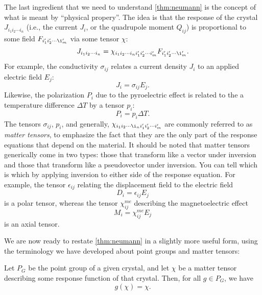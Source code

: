 The last ingredient that we need to understand \cref{thm:neumann} is the concept of what is meant by ``physical propery''.
The idea is that the response of the crystal $J_{i_1i_2\cdots i_n}$ (i.e., the current $J_i$, or the quadrupole moment $Q_{ij}$) is proportional to some field $F_{i_1'i_2'\cdots \i_m'}$ via some tensor $\chi$:
\begin{equation}
J_{i_1i_2\cdots i_n} = \chi_{i_1i_2\cdots i_n i_1' i_2'\cdots i_m'}F_{i_1' i_2' \cdots \i_m'}.
\end{equation}
For example, the conductivity $\sigma_{ij}$ relates a current density $J_i$ to an applied electric field $E_j$:
\begin{equation}
J_i = \sigma_{ij} E_j.
\end{equation}
Likewise, the polarization $P_i$ due to the pyroelectric effect is related to the a temperature difference $\Delta T$ by a tensor $p_i$:
\begin{equation}
P_i = p_i \Delta T.
\end{equation}
The tensors $\sigma_{ij}$, $p_i$, and generally, $\chi_{i_1 i_2 \cdots \i_n i_1' i_2' \cdots i_m'}$ are commonly referred to as \emph{matter tensors}\citep{powell}, to emphasize the fact that they are the only part of the response equations that depend on the material.
It should be noted that matter tensors generically come in two types: those that transform like a vector under inversion and those that transform like a pseudovector under inversion.
You can tell which is which by applying inversion to either side of the response equation.
For example, the tensor $\epsilon_{ij}$ relating the displacement field to the electric field
\begin{equation}
D_i = \epsilon_{ij}E_j
\end{equation} 
is a polar tensor, whereas the tensor $\chi^{me}_{ij}$ describing the magnetoelectric effect
\begin{equation}
M_i = \chi^{me}_{ij} E_j
\end{equation}
is an axial tensor.

We are now ready to restate \cref{thm:neumann} in a slightly more useful form, using the terminology we have developed about point groups and matter tensors:
\begin{theorem}\label{thm:neumannrestated}
Let $P_G$ be the point group of a given crystal, and let $\chi$ be a matter tensor describing some response function of that crystal.
Then, for all $g \in P_G$, we have
\begin{equation}\label{eq:nmmath}
g(\chi) = \chi.
\end{equation}
\end{theorem}

